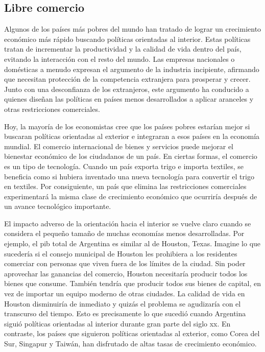 \documentclass[
]{krantz}
\begin{document}
\hypertarget{libre-comercio}{%
\subsection{Libre comercio}\label{libre-comercio}}

Algunos de los países más pobres del mundo han tratado de lograr un crecimiento económico más rápido buscando políticas orientadas al interior. Estas políticas tratan de incrementar la productividad y la calidad de vida dentro del país, evitando la interacción con el resto del mundo. Las empresas nacionales o domésticas a menudo expresan el argumento de la industria incipiente, afirmando que necesitan protección de la competencia extranjera para prosperar y crecer. Junto con una desconfianza de los extranjeros, este argumento ha conducido a quienes diseñan las políticas en países menos desarrollados a aplicar aranceles y otras restricciones comerciales.

Hoy, la mayoría de los economistas cree que los países pobres estarían mejor si buscaran políticas orientadas al exterior e integraran a esos países en la economía mundial. El comercio internacional de bienes y servicios puede mejorar el bienestar económico de los ciudadanos de un país. En ciertas formas, el comercio es un tipo de tecnología. Cuando un país exporta trigo e importa textiles, se beneficia como si hubiera inventado una nueva tecnología para convertir el trigo en textiles. Por consiguiente, un país que elimina las restricciones comerciales experimentará la misma clase de crecimiento económico que ocurriría después de un avance tecnológico importante.

El impacto adverso de la orientación hacia el interior se vuelve claro cuando se considera el pequeño tamaño de muchas economías menos desarrolladas. Por ejemplo, el pib total de Argentina es similar al de Houston, Texas. Imagine lo que sucedería si el consejo municipal de Houston les prohibiera a los residentes comerciar con personas que viven fuera de los límites de la ciudad. Sin poder aprovechar las ganancias del comercio, Houston necesitaría producir todos los bienes que consume. También tendría que producir todos sus bienes de capital, en vez de importar un equipo moderno de otras ciudades. La calidad de vida en Houston disminuiría de inmediato y quizás el problema se agudizaría con el transcurso del tiempo. Esto es precisamente lo que sucedió cuando Argentina siguió políticas orientadas al interior durante gran parte del siglo xx. En contraste, los países que siguieron políticas orientadas al exterior, como Corea del Sur, Singapur y Taiwán, han disfrutado de altas tasas de crecimiento económico.
\end{document}
